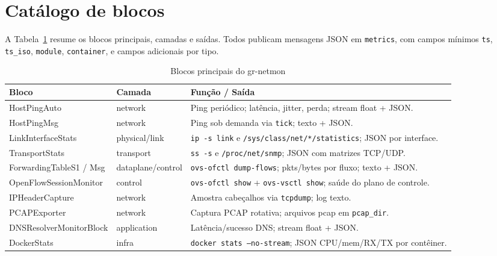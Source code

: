 \documentclass[11pt,a4paper]{article}
\begin{document}
\section{Catálogo de blocos}
A Tabela~\ref{tab:blocos} resume os blocos principais, camadas e saídas. Todos publicam mensagens JSON em \texttt{metrics}, com campos mínimos \texttt{ts}, \texttt{ts\_iso}, \texttt{module}, \texttt{container}, e campos adicionais por tipo.

\begin{longtable}{p{3.5cm}p{2.3cm}p{7.5cm}}
\caption{Blocos principais do gr-netmon}\label{tab:blocos}\\\toprule
Bloco & Camada & Função / Saída \\\midrule
HostPingAuto & network & Ping periódico; latência, jitter, perda; stream float + JSON. \\
HostPingMsg & network & Ping sob demanda via \texttt{tick}; texto + JSON. \\
LinkInterfaceStats & physical/link & \texttt{ip -s link} e \texttt{/sys/class/net/*/statistics}; JSON por interface. \\
TransportStats & transport & \texttt{ss -s} e \texttt{/proc/net/snmp}; JSON com matrizes TCP/UDP. \\
ForwardingTableS1 / Msg & dataplane/control & \texttt{ovs-ofctl dump-flows}; pkts/bytes por fluxo; texto + JSON. \\
OpenFlowSessionMonitor & control & \texttt{ovs-ofctl show} + \texttt{ovs-vsctl show}; saúde do plano de controle. \\
IPHeaderCapture & network & Amostra cabeçalhos via \texttt{tcpdump}; log texto. \\
PCAPExporter & network & Captura PCAP rotativa; arquivos pcap em \texttt{pcap_dir}. \\
DNSResolverMonitorBlock & application & Latência/sucesso DNS; stream float + JSON. \\
DockerStats & infra & \texttt{docker stats --no-stream}; JSON CPU/mem/RX/TX por contêiner. \\
\bottomrule
\end{longtable}
\end{document}
